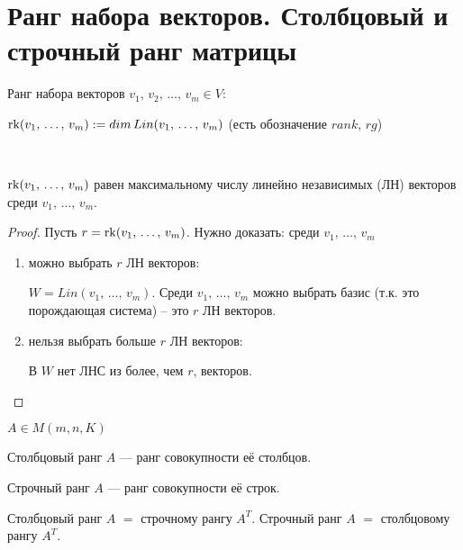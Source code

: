 
\section{Ранг набора векторов. Столбцовый и строчный ранг матрицы}

\begin{conj} 

    Ранг набора векторов $v_1,\, v_2,\, \dots,\, v_m \in V$: 
    
    $\operatorname{rk}(v_1,\, \dots,\, v_m) := dim\, Lin(v_1,\, \dots,\, v_m)$ (есть обозначение $rank$, $rg$)

\end{conj}
\
\begin{theorem-non} 
    
    $\operatorname{rk}(v_1,\, \dots,\, v_m)$ равен максимальному числу линейно независимых (ЛН) векторов среди $v_1,\, \dots,\, v_m$.
    \begin{proof}
        
        Пусть $r = \operatorname{rk}(v_1,\, \dots,\, v_m)$. Нужно доказать: среди $v_1,\, \dots,\, v_m$

        \begin{enumerate}
            \item можно выбрать $r$ ЛН векторов:
            
            $W = Lin(v_1,\, \dots,\, v_m)$. 
            Среди $v_1,\, \dots,\, v_m$ можно выбрать базис (т.к. это порождающая система) -- это $r$ ЛН векторов.
            \item нельзя выбрать больше $r$ ЛН векторов:
            
            В $W$ нет ЛНС из более, чем $r$, векторов.
        \end{enumerate}
        
    \end{proof}
\end{theorem-non}

\begin{conj} 

    $A \in M(m, n, K)$

    Столбцовый ранг $A$ --- ранг совокупности её столбцов.

    Строчный ранг $A$ --- ранг совокупности её строк.

\end{conj}

\notice Столбцовый ранг $A$ $=$ строчному рангу $A^T$. Строчный ранг $A$ $=$ столбцовому рангу $A^T$.

